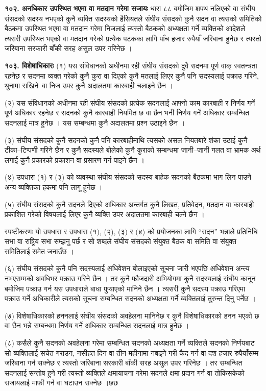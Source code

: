 \textbf{१०२. अनधिकार उपस्थित भएमा वा मतदान गरेमा सजायः} धारा ८८ बमोजिम शपथ नलिएको वा संघीय संसदको सदस्य नभएको कुनै व्यक्ति सदस्यको हैसियतले संघीय संसदको कुनै सदन वा त्यसको समितिको बैठकमा उपस्थित भएमा वा मतदान गरेमा निजलाई त्यस्तो बैठकको अध्यक्षता गर्ने व्यक्तिको आदेशले त्यसरी उपस्थित भएको वा मतदान गरेको प्रत्येक पटकका लागि पाँच हजार रुपैयाँ जरिबाना हुनेछ र त्यस्तो जरिबाना सरकारी बाँकी सरह असुल उपर गरिनेछ ।

\textbf{१०३. विशेषाधिकारः} (१) यस संविधानको अधीनमा रही संघीय संसदको दुवै सदनमा पूर्ण वाक् स्वतन्त्रता रहनेछ र सदनमा व्यक्त गरेको कुनै कुरा वा दिएको कुनै मतलाई लिएर कुनै पनि सदस्यलाई पक्राउ गरिने, थुनामा राखिने वा निज उपर कुनै अदालतमा कारबाही चलाइने छैन ।

(२) यस संविधानको अधीनमा रही संघीय संसदको प्रत्येक सदनलाई आफ्नो काम कारबाही र निर्णय गर्ने पूर्ण अधिकार रहनेछ र सदनको कुनै कारबाही नियमित छ वा छैन भनी निर्णय गर्ने अधिकार सम्बन्धित सदनलाई मात्र हुनेछ । यस सम्बन्धमा कुनै अदालतमा प्रश्न उठाइने छैन ।

(३) संघीय संसदको कुनै सदनको कुनै पनि कारबाहीमाथि त्यसको असल नियतबारे शंका उठाई कुनै टीका–टिप्पणी गरिने छैन र कुनै सदस्यले बोलेको कुनै कुराको सम्बन्धमा जानी–जानी गलत वा भ्रामक अर्थ लगाई कुनै प्रकारको प्रकाशन वा प्रसारण गर्न पाइने छैन ।

(४) उपधारा (१) र (३) को व्यवस्था संघीय संसदको सदस्य बाहेक सदनको बैठकमा भाग लिन पाउने अन्य व्यक्तिका हकमा पनि लागू हुनेछ ।

(५) संघीय संसदको कुनै सदनले दिएको अधिकार अन्तर्गत कुनै लिखत, प्रतिवेदन, मतदान वा कारबाही प्रकाशित गरेको विषयलाई लिएर कुनै व्यक्ति उपर अदालतमा कारबाही चल्ने छैन ।

स्पष्टीकरणः यो उपधारा र उपधारा (१), (२), (३) र (४) को प्रयोजनका लागि “सदन” भन्नाले प्रतिनिधि सभा वा राष्ट्रिय सभा सम्झनु पर्छ र सो शब्दले संघीय संसदको संयुक्त बैठक वा समिति वा संयुक्त समितिलाई समेत जनाउँछ ।

(६) संघीय संसदको कुनै पनि सदस्यलाई अधिवेशन बोलाइएको सूचना जारी भएपछि अधिवेशन अन्त्य नभएसम्मको अवधिभर पक्राउ गरिने छैन । तर कुनै फौजदारी अभियोगमा कुनै सदस्यलाई संघीय कानून बमोजिम पक्राउ गर्न यस उपधाराले बाधा पुर्‍याएको मानिने छैन । त्यसरी कुनै सदस्य पक्राउ गरिएमा पक्राउ गर्ने अधिकारीले त्यसको सूचना सम्बन्धित सदनको अध्यक्षता गर्ने व्यक्तिलाई तुरुन्त दिनु पर्नेछ ।

(७) विशेषाधिकारको हननलाई संघीय संसदको अवहेलना मानिनेछ र कुनै विशेषाधिकारको हनन भएको छ वा छैन भन्ने सम्बन्धमा निर्णय गर्ने अधिकार सम्बन्धित सदनलाई मात्र हुनेछ ।

(८) कसैले कुनै सदनको अवहेलना गरेमा सम्बन्धित सदनको अध्यक्षता गर्ने व्यक्तिले सदनको निर्णयबाट सो व्यक्तिलाई सचेत गराउन, नसीहत दिन वा तीन महीनामा नबढ्ने गरी कैद गर्न वा दश हजार रुपैयाँसम्म जरिबाना गर्न सक्नेछ र त्यस्तो जरिबाना सरकारी बाँकी सरह असुल उपर गरिनेछ । तर सम्बन्धित सदनलाई सन्तोष हुने गरी त्यस्तो व्यक्तिले क्षमायाचना गरेमा सदनले क्षमा प्रदान गर्न वा तोकिसकेको सजायलाई माफी गर्न वा घटाउन सक्नेछ ।छछ

